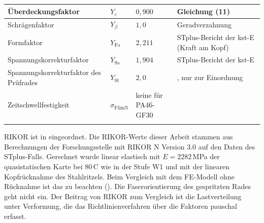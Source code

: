 \begin{table}[htbp]
\begin{tabular}{L{4.6cm}L{1.6cm}L{3.6cm}L{4.9cm}}
		\hline
		Überdeckungsfaktor                     & $Y_{\varepsilon}$         & $0{,}900$                       & Gleichung (11) \cite[S.~13]{VDI2736-2}                                                \\
		\hline
		Schrägenfaktor                         & $Y_{\beta}$               & $1{,}0$                         & Geradverzahnung \cite[S.~13]{VDI2736-2}                                               \\
		\hline
		Formfaktor                             & $Y_{\mathrm{Fa}}$         & $2{,}211$                       & STplus-Bericht der kst-E (Kraft am Kopf)                                              \\
		\hline
		Spannungskorrekturfaktor               & $Y_{\mathrm{Sa}}$         & $1{,}904$                       & STplus-Bericht der kst-E                                                              \\
		\hline
		Spannungskorrekturfaktor des Prüfrades & $Y_{\mathrm{St}}$         & $2{,}0$                         & \cite[S.~13]{VDI2736-2}, nur zur Einordnung                                           \\
		\hline
		Zeitschwellfestigkeit                  & $\sigma_{\mathrm{FlimN}}$ & keine für PA46-GF30             & \cite[S.~14]{VDI2736-2}                                                               \\
		\hline
	\end{tabular}
\end{table}



RIKOR ist in  eingeordnet. Die RIKOR-Werte dieser Arbeit stammen aus Berechnungen der Forschungsstelle mit RIKOR N Version 3.0 auf den Daten des STplus-Falls. Gerechnet wurde linear elastisch mit $E = 2282$\,MPa der quasistatischen Karte bei $80$\,\textdegree C wie in der Stufe W1 und mit der linearen Kopfrücknahme des Stahlritzels. Beim Vergleich mit dem FE-Modell ohne Rücknahme ist das zu beachten (). Die Faserorientierung des gespritzten Rades geht nicht ein. Der Beitrag von RIKOR zum Vergleich ist die Lastverteilung unter Verformung, die das Richtlinienverfahren über die Faktoren pauschal erfasst.

